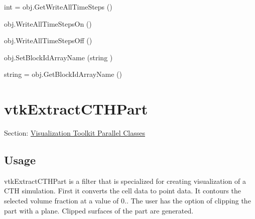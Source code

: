 \begin{DoxyItemize}
\item {\ttfamily int = obj.\-Get\-Write\-All\-Time\-Steps ()}  
\item {\ttfamily obj.\-Write\-All\-Time\-Steps\-On ()}  
\item {\ttfamily obj.\-Write\-All\-Time\-Steps\-Off ()}  
\item {\ttfamily obj.\-Set\-Block\-Id\-Array\-Name (string )}  
\item {\ttfamily string = obj.\-Get\-Block\-Id\-Array\-Name ()}  
\end{DoxyItemize}\hypertarget{vtkparallel_vtkextractcthpart}{}\section{vtk\-Extract\-C\-T\-H\-Part}\label{vtkparallel_vtkextractcthpart}
Section\-: \hyperlink{sec_vtkparallel}{Visualization Toolkit Parallel Classes} \hypertarget{vtkwidgets_vtkxyplotwidget_Usage}{}\subsection{Usage}\label{vtkwidgets_vtkxyplotwidget_Usage}
vtk\-Extract\-C\-T\-H\-Part is a filter that is specialized for creating visualization of a C\-T\-H simulation. First it converts the cell data to point data. It contours the selected volume fraction at a value of 0.. The user has the option of clipping the part with a plane. Clipped surfaces of the part are generated.

